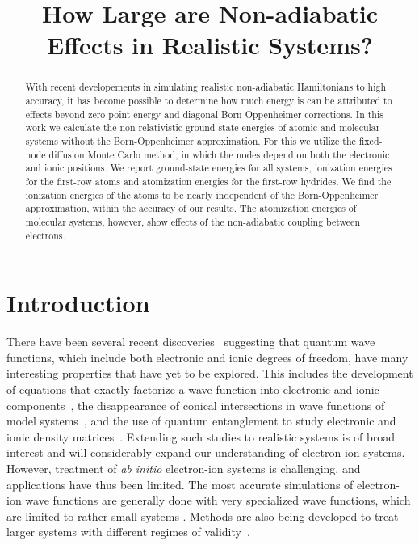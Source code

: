 \documentclass[pra,superscriptaddress,groupedaddress,twocolumn]{revtex4-1}
\begin{document}
\title{How Large are Non-adiabatic Effects in Realistic Systems?}

\begin{abstract}
With recent developements in simulating realistic non-adiabatic 
Hamiltonians to high accuracy, it has become possible to determine
how much energy is can be attributed to effects beyond zero point energy and
diagonal Born-Oppenheimer corrections. 
In this work we calculate the non-relativistic ground-state energies of atomic and
 molecular systems without the Born-Oppenheimer approximation. 
For this we utilize the fixed-node diffusion Monte Carlo method, in which 
the nodes depend on both the electronic and ionic positions. We report 
ground-state energies for all systems, ionization energies for the first-row 
atoms and atomization energies for the first-row hydrides. 
We find the ionization energies of the atoms to be nearly independent of the 
Born-Oppenheimer approximation, within the accuracy of our results. The atomization energies of molecular systems, 
however, show effects of the non-adiabatic coupling between electrons. 
\end{abstract}
\maketitle

\section{Introduction}
There have been several recent discoveries~\cite{Tubman_ECG,cederbaum1,gross2014,boent,Martinez_Review} suggesting that quantum wave functions, which include both electronic and ionic degrees of freedom, have many interesting properties that have yet to be explored.  This includes the development of equations that exactly factorize a wave function into electronic and ionic components~\cite{cederbaum1}, the disappearance of conical intersections in wave functions of model systems~\cite{gross2014}, and the use of quantum entanglement to study electronic and ionic density matrices~\cite{boent}. Extending such studies to realistic systems is of broad interest and will considerably expand our understanding of electron-ion systems. However, treatment of \textit{ab initio} electron-ion systems is challenging, and applications have thus been limited. The most accurate simulations of electron-ion wave functions are generally done with very specialized wave functions, which are limited to rather small systems \cite{mitroy2013}. Methods are also being developed to treat larger systems with different regimes of validity~\cite{Sharon_NEO-HF,Sharon_XCNEO-HF1,Sharon_XCNEO-HF2,Sharon_XCNEO-HF,Kurt_XCNEO-HF,Kurt_XCNEO-HF1,Sharon_NEO-DFT,Sharon_NEO-DFT2,Sharon_NEO-DFT3,Gross_NEO-DFT,Gross_NEO-DFT1,Ilkka_Path,Ilkka_Path1,Ilkka_Path2}.
\end{document}
